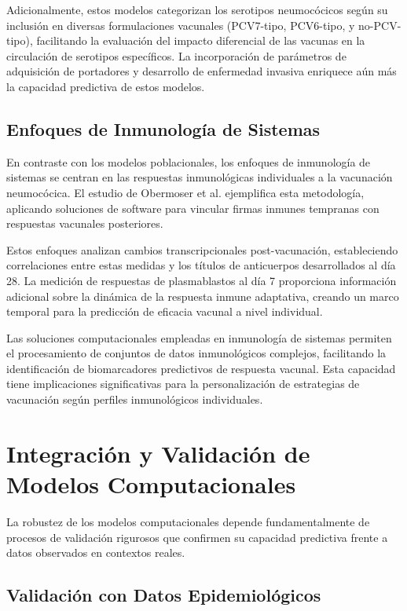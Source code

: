 Adicionalmente, estos modelos categorizan los serotipos neumocócicos según su inclusión en diversas formulaciones vacunales (PCV7-tipo, PCV6-tipo, y no-PCV-tipo), facilitando la evaluación del impacto diferencial de las vacunas en la circulación de serotipos específicos. La incorporación de parámetros de adquisición de portadores y desarrollo de enfermedad invasiva enriquece aún más la capacidad predictiva de estos modelos.

\subsection{Enfoques de Inmunología de Sistemas}

En contraste con los modelos poblacionales, los enfoques de inmunología de sistemas se centran en las respuestas inmunológicas individuales a la vacunación neumocócica. El estudio de Obermoser et al. \cite{Obermoser2013} ejemplifica esta metodología, aplicando soluciones de software para vincular firmas inmunes tempranas con respuestas vacunales posteriores.

Estos enfoques analizan cambios transcripcionales post-vacunación, estableciendo correlaciones entre estas medidas y los títulos de anticuerpos desarrollados al día 28. La medición de respuestas de plasmablastos al día 7 proporciona información adicional sobre la dinámica de la respuesta inmune adaptativa, creando un marco temporal para la predicción de eficacia vacunal a nivel individual.

Las soluciones computacionales empleadas en inmunología de sistemas permiten el procesamiento de conjuntos de datos inmunológicos complejos, facilitando la identificación de biomarcadores predictivos de respuesta vacunal. Esta capacidad tiene implicaciones significativas para la personalización de estrategias de vacunación según perfiles inmunológicos individuales.

\section{Integración y Validación de Modelos Computacionales}

La robustez de los modelos computacionales depende fundamentalmente de procesos de validación rigurosos que confirmen su capacidad predictiva frente a datos observados en contextos reales.

\subsection{Validación con Datos Epidemiológicos}

